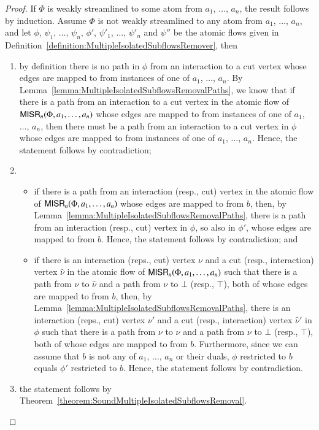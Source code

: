 \begin{proof}
If $\Phi$ is weakly streamlined to some atom from $a_1$, $\dots$, $a_n$, the result follows by induction. Assume $\Phi$ is not weakly streamlined to any atom from $a_1$, $\dots$, $a_n$, and let $\phi$, $\psi_1$, $\dots$, $\psi_n$, $\phi'$, $\psi'_1$, $\dots$, $\psi'_n$ and $\psi''$ be the atomic flows given in Definition~\ref{definition:MultipleIsolatedSubflowsRemover}, then
\begin{enumerate}
\item by definition there is no path in $\phi$ from an interaction to a cut vertex whose edges are mapped to from instances of one of $a_1$, $\dots$, $a_n$. By Lemma~\vref{lemma:MultipleIsolatedSubflowsRemovalPaths}, we know that if there is a path from an interaction to a cut vertex in the atomic flow of $\mathsf{MISR}_n(\Phi,a_1,\dots,a_n)$ whose edges are mapped to from instances of one of $a_1$, $\dots$, $a_n$, then there must be a path from an interaction to a cut vertex in $\phi$ whose edges are mapped to from instances of one of $a_1$, $\dots$, $a_n$. Hence, the statement follows by contradiction;
\item
\begin{itemize}
 \item if there is a path from an interaction (resp., cut) vertex in the atomic flow of $\mathsf{MISR}_n(\Phi,a_1,\dots,a_n)$ whose edges are mapped to from $b$, then, by Lemma~\ref{lemma:MultipleIsolatedSubflowsRemovalPaths}, there is a path from an interaction (resp., cut) vertex in $\phi$, so also in $\phi'$, whose edges are mapped to from $b$. Hence, the statement follows by contradiction; and
 \item if there is an interaction (reps., cut) vertex $\nu$ and a cut (resp., interaction) vertex $\hat\nu$ in the atomic flow of $\mathsf{MISR}_n(\Phi,a_1,\dots,a_n)$ such that there is a path from $\nu$ to $\hat\nu$ and a path from $\nu$ to $\bot$ (resp., $\top$), both of whose edges are mapped to from $b$, then, by Lemma~\ref{lemma:MultipleIsolatedSubflowsRemovalPaths}, there is an interaction (reps., cut) vertex $\nu'$ and a cut (resp., interaction) vertex $\hat\nu'$ in $\phi$ such that there is a path from $\nu$ to $\hat\nu$ and a path from $\nu$ to $\bot$ (resp., $\top$), both of whose edges are mapped to from $b$. Furthermore, since we can assume that $b$ is not any of $a_1$, $\dots$, $a_n$ or their duals, $\phi$ restricted to $b$ equals $\phi'$ restricted to $b$. Hence, the statement follows by contradiction.
\end{itemize}
\item the statement follows by Theorem~\vref{theorem:SoundMultipleIsolatedSubflowsRemoval}.
\end{enumerate}
\end{proof}

